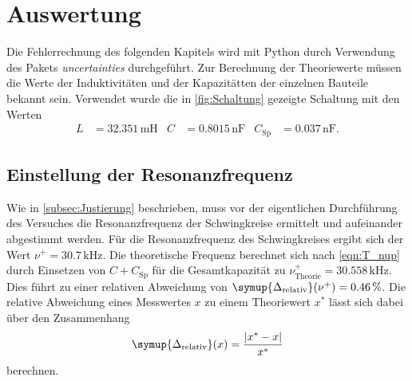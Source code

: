 \section{Auswertung}
\label{sec:Auswertung}
Die Fehlerrechnung des folgenden Kapitels wird mit Python durch Verwendung des Pakets \textit{uncertainties} \cite{uncertainties} durchgeführt.
Zur Berechnung der Theoriewerte müssen die Werte der Induktivitäten und der Kapazitätten der einzelnen Bauteile bekannt sein. Verwendet wurde 
die in \autoref{fig:Schaltung} gezeigte Schaltung mit den Werten 
\begin{align*}
    L &= 32.351 \, \unit{\milli\henry} & C &= 0.8015 \, \unit{\nano\farad} & C_{\text{Sp}} &= 0.037 \, \unit{\nano\farad}.
\end{align*}

\subsection{Einstellung der Resonanzfrequenz}
\label{subsec:A_Resonanz}
Wie in \autoref{subsec:Justierung} beschrieben, muss vor der eigentlichen Durchführung des Versuches die Resonanzfrequenz der Schwingkreise ermittelt und aufeinander abgestimmt 
werden. Für die Resonanzfrequenz des Schwingkreises ergibt sich der Wert $\nu^+ = 30.7 \, \unit{\kilo\hertz}$. Die theoretische Frequenz berechnet sich nach \autoref{eqn:T_nup}
durch Einsetzen von $C + C_\text{Sp}$ für die Gesamtkapazität zu $\nu^+_\text{Theorie} = 30.558 \, \unit{\kilo\hertz}$. Dies führt zu einer relativen Abweichung von 
$\symup{\Delta_\text{relativ}}(\nu^+) = 0.46 \, \%$. Die relative Abweichung eines Messwertes $x$ zu einem Theoriewert $x^*$ lässt sich dabei über den Zusammenhang
\begin{equation}
    \label{eqn:rel_Abw}
    \symup{\Delta_\text{relativ}}(x) = \frac{|x^* - x|}{x^*}
\end{equation}
berechnen.

